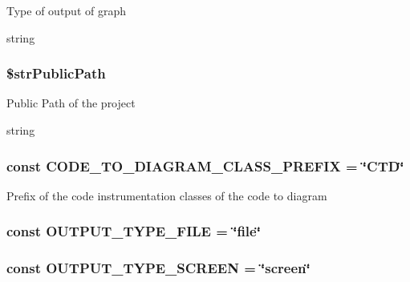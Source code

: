 Type of output of graph

string \hypertarget{class_code_to_diagram_5fa653f11488edb1d638093f347807f5}{
\subsubsection[{\$strPublicPath}]{\setlength{\rightskip}{0pt plus 5cm}\$strPublicPath}}
\label{class_code_to_diagram_5fa653f11488edb1d638093f347807f5}


Public Path of the project

string \hypertarget{class_code_to_diagram_acb520be3f3e0ee2cd05b90c8d9887a6}{
\subsubsection[{CODE\_\-TO\_\-DIAGRAM\_\-CLASS\_\-PREFIX}]{\setlength{\rightskip}{0pt plus 5cm}const {\bf CODE\_\-TO\_\-DIAGRAM\_\-CLASS\_\-PREFIX} = \char`\"{}CTD\char`\"{}}}
\label{class_code_to_diagram_acb520be3f3e0ee2cd05b90c8d9887a6}


Prefix of the code instrumentation classes of the code to diagram \hypertarget{class_code_to_diagram_6432f4d95031e2666449bb92c20f7d7e}{
\subsubsection[{OUTPUT\_\-TYPE\_\-FILE}]{\setlength{\rightskip}{0pt plus 5cm}const {\bf OUTPUT\_\-TYPE\_\-FILE} = \char`\"{}file\char`\"{}}}
\label{class_code_to_diagram_6432f4d95031e2666449bb92c20f7d7e}


\hypertarget{class_code_to_diagram_746cadd14bdda9d3c0ae3c4433bc2478}{
\subsubsection[{OUTPUT\_\-TYPE\_\-SCREEN}]{\setlength{\rightskip}{0pt plus 5cm}const {\bf OUTPUT\_\-TYPE\_\-SCREEN} = \char`\"{}screen\char`\"{}}}
\label{class_code_to_diagram_746cadd14bdda9d3c0ae3c4433bc2478}


